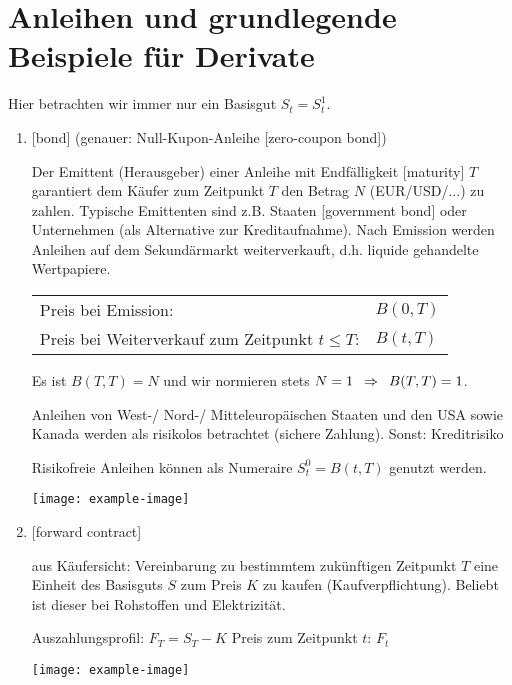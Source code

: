 \section{Anleihen und grundlegende Beispiele für Derivate}

Hier betrachten wir immer nur ein Basisgut $S_t = S_t^1$.

\begin{enumerate}[leftmargin=*, label=(\alph*)]
	\item {} [bond] (genauer: Null-Kupon-Anleihe [zero-coupon bond])
	
	Der Emittent (Herausgeber) einer Anleihe mit Endfälligkeit [maturity] $T$ garantiert dem Käufer zum Zeitpunkt $T$ den Betrag $N$ (EUR/USD/...) zu zahlen.
	Typische Emittenten sind z.B. Staaten [government bond] oder Unternehmen (als Alternative zur Kreditaufnahme).
	Nach Emission werden Anleihen auf dem Sekundärmarkt weiterverkauft, d.h. liquide gehandelte Wertpapiere. 
	
	\begin{tabular}{ll}
		Preis bei Emission: & $B(0,T)$ \\
		Preis bei Weiterverkauf zum Zeitpunkt $t \le T$: & $B(t,T)$ \\
	\end{tabular}
	
	Es ist $B(T,T) = N$ und wir normieren stets $N=1 \enskip \Rightarrow \enskip B(T,T)=1$.
	
	Anleihen von West-/ Nord-/ Mitteleuropäischen Staaten und den USA sowie Kanada werden als risikolos betrachtet (sichere Zahlung). Sonst: Kreditrisiko
	
	Risikofreie Anleihen können als Numeraire $S_t^0 = B(t,T)$ genutzt werden.
	
	\begin{center}
		\texttt{[image: example-image]}
	\end{center}
	
	\item {} [forward contract]
	
	aus Käufersicht: Vereinbarung zu bestimmtem zukünftigen Zeitpunkt $T$ eine Einheit des Basisguts $S$ zum Preis $K$ zu kaufen (Kaufverpflichtung). Beliebt ist dieser bei Rohstoffen und Elektrizität.
	
	Auszahlungsprofil: $F_T = S_T - K$
	Preis zum Zeitpunkt $t$: $F_t$
	
	\begin{center}
		\texttt{[image: example-image]}
	\end{center}
	

\end{enumerate}
